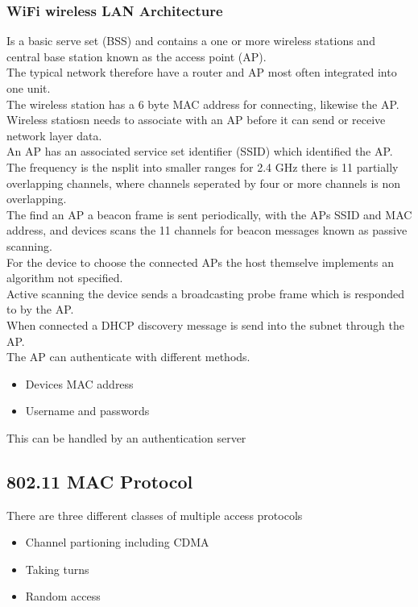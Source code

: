 \documentclass[12pt, a4paper]{article}
\begin{document}
		\subsubsection{WiFi wireless LAN Architecture}
			Is a basic serve set (BSS) and contains a one or more wireless stations and central base station known as the access point (AP).\\
			The typical network therefore have a router and AP most often integrated into one unit.\\
			The wireless station has a 6 byte MAC address for connecting, likewise the AP.\\
			Wireless statiosn needs to associate with an AP before it can send or receive network layer data.\\
			An AP has an associated service set identifier (SSID) which identified the AP.\\
			The frequency is the nsplit into smaller ranges for 2.4 GHz there is 11 partially overlapping channels, where channels seperated by four or more channels is non overlapping.\\
			The find an AP a beacon frame is sent periodically, with the APs SSID and MAC address, and devices scans the 11 channels for beacon messages known as passive scanning.\\
			For the device to choose the connected APs the host themselve implements an algorithm not specified.\\
			Active scanning the device sends a broadcasting probe frame which is responded to by the AP.\\
			When connected a DHCP discovery message is send into the subnet through the AP.\\
			The AP can authenticate with different methods.\\
			\begin{itemize}
				\item Devices MAC address
				\item Username and passwords
			\end{itemize}
			This can be handled by an authentication server 
	\subsection{802.11 MAC Protocol}
		There are three different classes of multiple access protocols
		\begin{itemize}
			\item Channel partioning including CDMA
			\item Taking turns
			\item Random access
		\end{itemize}
\end{document}
